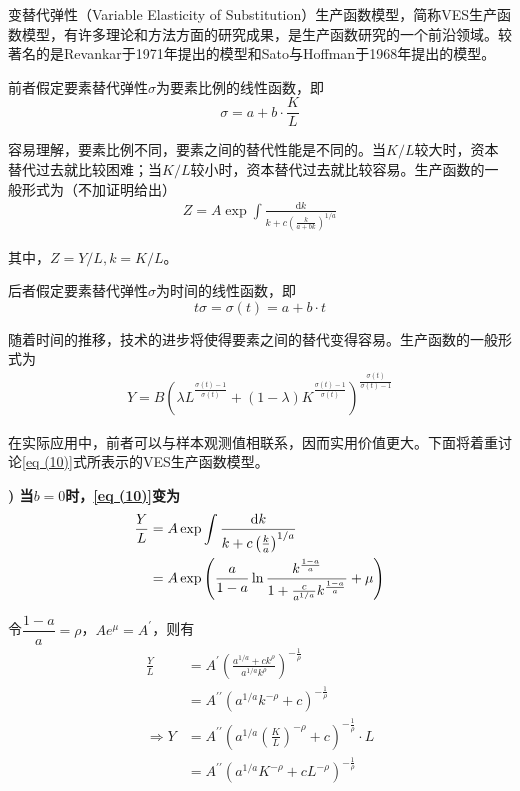 	变替代弹性（Variable Elasticity of Substitution）生产函数模型，简称VES生产函数模型，有许多理论和方法方面的研究成果，是生产函数研究的一个前沿领域。较著名的是Revankar于1971年提出的模型和Sato与Hoffman于1968年提出的模型。
		
	前者假定要素替代弹性$ \sigma $为要素比例的线性函数，即 
	$$ \sigma=a+b \cdot \frac{K}{L} $$
		
	容易理解，要素比例不同，要素之间的替代性能是不同的。当$ K/L $较大时，资本替代过去就比较困难；当$ K/L $较小时，资本替代过去就比较容易。生产函数的一般形式为（不加证明给出）
	\begin{equation}
		\begin{aligned}
			Z=A \exp \int \frac{\mathrm{d}k}{k+c\left(\frac{k}{a+b k}\right)^{1 / a}} 
			\label{eq (10)}
		\end{aligned}
	\end{equation}

	其中，$ Z=Y / L, k=K / L $。
		
	后者假定要素替代弹性$ \sigma $为时间的线性函数，即
	$$ t \sigma=\sigma(t)=a+b \cdot t $$

	随着时间的推移，技术的进步将使得要素之间的替代变得容易。生产函数的一般形式为
	\begin{align}
		Y=B\left(\lambda L^{\frac{\sigma(t)-1}{\sigma(t)}}+(1-\lambda) K^{\frac{\sigma(t)-1}{\sigma(t)}}\right)^{\frac{\sigma(t)}{\sigma(t)-1}} \label{eq (11)}
	\end{align}

	在实际应用中，前者可以与样本观测值相联系，因而实用价值更大。下面将着重讨论\eqref{eq (10)}式所表示的VES生产函数模型。

{\bf {}) 当$ b=0 $时，\eqref{eq (10)}变为}
	\begin{equation}
		\begin{aligned}
			\frac{Y}{L} & = A \exp \int \frac{\mathrm{d}k}{k+c\left(\frac{k}{a}\right)^{1 / a}} \\
			& = A \exp \left(\frac{a}{1-a} \ln \frac{k^{\frac{1-a}{a}}}{1+\frac{c}{a^{1 / a}} k^{\frac{1-a}{a}}}+\mu\right) \notag
		\end{aligned}
	\end{equation}

	令$ \dfrac{1-a}{a}=\rho $，$ A e^{\mu}=A^{\prime} $，则有
	\begin{align}
		\frac{Y}{L} & = A^{\prime}\left(\frac{a^{1 / a}+c k^{\rho}}{a^{1 / a} k^{\rho}}\right)^{-\frac{1}{\rho}} \nonumber \\
		& = A^{\prime \prime}\left(a^{1 / a} k^{-\rho}+c\right)^{-\frac{1}{\rho}} \nonumber \\
		\Rightarrow Y & = A^{\prime \prime}\left(a^{1 / a}\left(\frac{K}{L}\right)^{-\rho}+c\right)^{-\frac{1}{\rho}} \cdot L \nonumber \\
		& = A^{\prime \prime}\left(a^{1 / a} K^{-\rho}+c L^{-\rho}\right)^{-\frac{1}{\rho}} \label{eq (12)}
	\end{align} 

